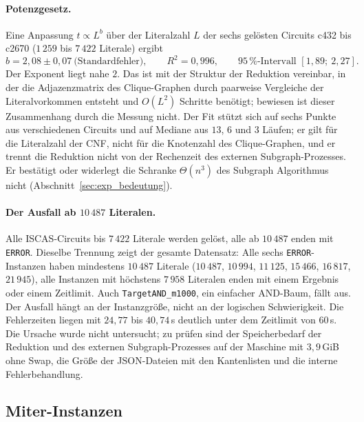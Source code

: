 \paragraph{Potenzgesetz.} Eine Anpassung $t\propto L^b$ über der Literalzahl $L$ der sechs gelösten Circuits c432 bis c2670 ($1\,259$ bis $7\,422$ Literale) ergibt
\[
b = 2{,}08 \pm 0{,}07\ \text{(Standardfehler)},\qquad R^2 = 0{,}996,\qquad 95\,\%\text{-Intervall }[1{,}89;\ 2{,}27].
\]
Der Exponent liegt nahe $2$. Das ist mit der Struktur der Reduktion vereinbar, in der die Adjazenzmatrix des Clique-Graphen durch paarweise Vergleiche der Literalvorkommen entsteht und $O(L^2)$ Schritte benötigt; bewiesen ist dieser Zusammenhang durch die Messung nicht. Der Fit stützt sich auf sechs Punkte aus verschiedenen Circuits und auf Mediane aus $13$, $6$ und $3$ Läufen; er gilt für die Literalzahl der CNF, nicht für die Knotenzahl des Clique-Graphen, und er trennt die Reduktion nicht von der Rechenzeit des externen Subgraph-Prozesses. Er bestätigt oder widerlegt die Schranke $\Theta(n^3)$ des Subgraph Algorithmus nicht (Abschnitt~\ref{sec:exp_bedeutung}).

\paragraph{Der Ausfall ab $10\,487$ Literalen.} Alle ISCAS-Circuits bis $7\,422$ Literale werden gelöst, alle ab $10\,487$ enden mit \texttt{ERROR}. Dieselbe Trennung zeigt der gesamte Datensatz: Alle sechs \texttt{ERROR}-Instanzen haben mindestens $10\,487$ Literale ($10\,487$, $10\,994$, $11\,125$, $15\,466$, $16\,817$, $21\,945$), alle Instanzen mit höchstens $7\,958$ Literalen enden mit einem Ergebnis oder einem Zeitlimit. Auch \texttt{TargetAND\_m1000}, ein einfacher AND-Baum, fällt aus. Der Ausfall hängt an der Instanzgröße, nicht an der logischen Schwierigkeit. Die Fehlerzeiten liegen mit $24{,}77$ bis $40{,}74$\,s deutlich unter dem Zeitlimit von $60$\,s. Die Ursache wurde nicht untersucht; zu prüfen sind der Speicherbedarf der Reduktion und des externen Subgraph-Prozesses auf der Maschine mit $3{,}9$\,GiB ohne Swap, die Größe der JSON-Dateien mit den Kantenlisten und die interne Fehlerbehandlung.

\subsection{Miter-Instanzen}

